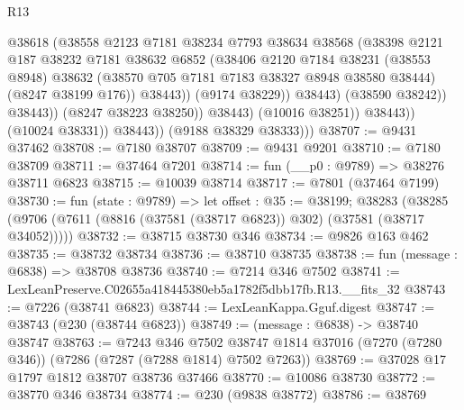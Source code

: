 \begin{lexlean}{R13}
\begin{coremodule}
                                  @38618
                                  (@38558
                                    @2123
                                    @7181
                                    @38234
                                    @7793
                                    @38634
                                    @38568
                                    (@38398
                                      @2121
                                      @187
                                      @38232
                                      @7181
                                      @38632
                                      @6852
                                      (@38406
                                        @2120
                                        @7184
                                        @38231
                                        (@38553 @8948)
                                        @38632
                                        (@38570 @705 @7181 @7183 @38327 @8948 @38580 @38444)
                                        (@8247 @38199 @176))
                                      @38443))
                                  (@9174 @38229))
                                @38443)
                              (@38590 @38242))
                            @38443))
                        (@8247 @38223 @38250))
                      @38443)
                    (@10016 @38251))
                  @38443))
              (@10024 @38331))
            @38443))
        (@9188 @38329 @38333)))
@38707 := @9431 @37462
@38708 := @7180 @38707
@38709 := @9431 @9201
@38710 := @7180 @38709
@38711 := @37464 @7201
@38714 := fun (__p0 : @9789) => @38276 @38711 @6823
@38715 := @10039 @38714
@38717 := @7801 (@37464 @7199)
@38730 := fun (state : @9789) =>
  let offset : @35 := @38199;
  @38283 (@38285 (@9706 (@7611 (@8816 (@37581 (@38717 @6823)) @302) (@37581 (@38717 @34052)))))
@38732 := @38715 @38730 @346
@38734 := @9826 @163 @462
@38735 := @38732 @38734
@38736 := @38710 @38735
@38738 := fun (message : @6838) => @38708 @38736
@38740 := @7214 @346 @7502
@38741 := LexLeanPreserve.C02655a418445380eb5a1782f5dbb17fb.R13.__fits_32
@38743 := @7226 (@38741 @6823)
@38744 := LexLeanKappa.Gguf.digest
@38747 := @38743 (@230 (@38744 @6823))
@38749 := (message : @6838) -> @38740 @38747
@38763 := @7243
    @346
    @7502
    @38747
    @1814
    @37016
    (@7270 (@7280 @346))
    (@7286 (@7287 (@7288 @1814) @7502 @7263))
@38769 := @37028 @17 @1797 @1812 @38707 @38736 @37466
@38770 := @10086 @38730
@38772 := @38770 @346 @38734
@38774 := @230 (@9838 @38772)
@38786 := @38769

\end{coremodule}
\end{lexlean}
